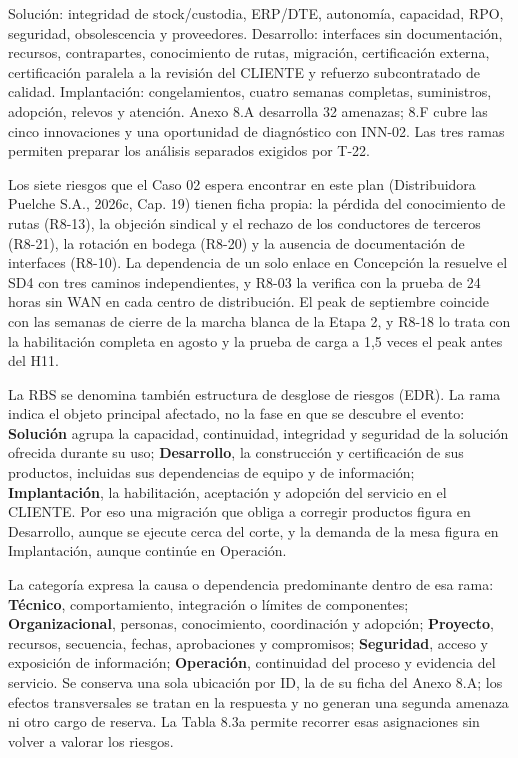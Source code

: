 Solución: integridad de stock/custodia, ERP/DTE, autonomía, capacidad, RPO, seguridad, obsolescencia y proveedores. Desarrollo: interfaces sin documentación, recursos, contrapartes, conocimiento de rutas, migración, certificación externa, certificación paralela a la revisión del CLIENTE y refuerzo subcontratado de calidad. Implantación: congelamientos, cuatro semanas completas, suministros, adopción, relevos y atención. Anexo 8.A desarrolla 32 amenazas; 8.F cubre las cinco innovaciones y una oportunidad de diagnóstico con INN-02. Las tres ramas permiten preparar los análisis separados exigidos por T-22.

Los siete riesgos que el Caso 02 espera encontrar en este plan (Distribuidora Puelche S.A., 2026c, Cap. 19) tienen ficha propia: la pérdida del conocimiento de rutas (R8-13), la objeción sindical y el rechazo de los conductores de terceros (R8-21), la rotación en bodega (R8-20) y la ausencia de documentación de interfaces (R8-10). La dependencia de un solo enlace en Concepción la resuelve el SD4 con tres caminos independientes, y R8-03 la verifica con la prueba de 24 horas sin WAN en cada centro de distribución. El peak de septiembre coincide con las semanas de cierre de la marcha blanca de la Etapa 2, y R8-18 lo trata con la habilitación completa en agosto y la prueba de carga a 1,5 veces el peak antes del H11.

La RBS se denomina también estructura de desglose de riesgos (EDR). La rama indica el objeto principal afectado, no la fase en que se descubre el evento: \textbf{Solución} agrupa la capacidad, continuidad, integridad y seguridad de la solución ofrecida durante su uso; \textbf{Desarrollo}, la construcción y certificación de sus productos, incluidas sus dependencias de equipo y de información; \textbf{Implantación}, la habilitación, aceptación y adopción del servicio en el CLIENTE. Por eso una migración que obliga a corregir productos figura en Desarrollo, aunque se ejecute cerca del corte, y la demanda de la mesa figura en Implantación, aunque continúe en Operación.

La categoría expresa la causa o dependencia predominante dentro de esa rama: \textbf{Técnico}, comportamiento, integración o límites de componentes; \textbf{Organizacional}, personas, conocimiento, coordinación y adopción; \textbf{Proyecto}, recursos, secuencia, fechas, aprobaciones y compromisos; \textbf{Seguridad}, acceso y exposición de información; \textbf{Operación}, continuidad del proceso y evidencia del servicio. Se conserva una sola ubicación por ID, la de su ficha del Anexo 8.A; los efectos transversales se tratan en la respuesta y no generan una segunda amenaza ni otro cargo de reserva. La Tabla 8.3a permite recorrer esas asignaciones sin volver a valorar los riesgos.

